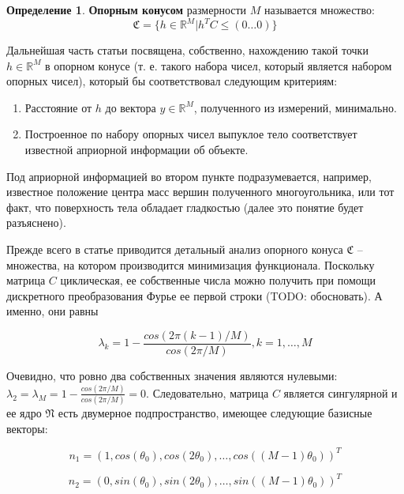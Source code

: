\documentclass[a4paper, 12pt, titlepage]{article}
\theoremstyle{definition}
\newtheorem{SmartDefinition}{Определение}
\theoremstyle{plain}
\theoremstyle{plain}
\begin{document}
\begin{SmartDefinition}
 \label{def:support-cone}
 \textbf{Опорным конусом} размерности $M$ называется множество:
 \begin{equation}
 \mathfrak{C} = \{h \in \mathbb{R}^{M} | h^{T} C \leq (0 \ldots 0) \}
 \end{equation}
\end{SmartDefinition}

Дальнейшая часть статьи посвящена, собственно, нахождению такой точки 
$h \in \mathbb{R}^{M}$ в
опорном конусе (т. е. такого набора чисел, который является набором опорных
чисел), который бы соответствовал следующим критериям:

\begin{enumerate}
 \item Расстояние от $h$ до вектора $y \in \mathbb{R}^{M}$, полученного из
измерений, минимально.
 \item Построенное по набору опорных чисел выпуклое тело соответствует
известной априорной информации об объекте.
\end{enumerate}

Под априорной информацией во втором пункте подразумевается, например, известное
положение центра масс вершин полученного многоугольника, или тот факт, что
поверхность тела обладает гладкостью (далее это понятие будет разъяснено).

Прежде всего в статье приводится детальный анализ опорного конуса $\mathfrak{C}$
-- множества, на котором производится минимизация функционала. Поскольку матрица
$C$ циклическая, ее собственные числа можно получить при помощи дискретного
преобразования Фурье ее первой строки (TODO: обосновать). А именно, они равны

\begin{equation}
\lambda_{k} = 1 - \frac{cos(2 \pi (k - 1) / M)}{cos(2 \pi / M)},
k = 1, \ldots, M
\end{equation}

Очевидно, что ровно два собственных значения являются нулевыми:
$\lambda_{2} = \lambda_{M} = 1 - \frac{cos(2 \pi / M)}{cos(2 \pi / M)} = 0$.
Следовательно, матрица $C$ является сингулярной и ее ядро $\mathfrak{N}$ есть
двумерное подпространство, имеющее следующие базисные векторы:

\begin{equation}
n_{1} = (1, cos(\theta_{0}), cos(2 \theta_{0}), \ldots,
cos((M - 1) \theta_{0}))^{T}
\end{equation}

\begin{equation}
n_{2} = (0, sin(\theta_{0}), sin(2 \theta_{0}), \ldots,
sin((M - 1) \theta_{0}))^{T}
\end{equation}
\end{document}

